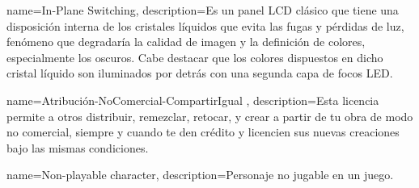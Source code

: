 

{
	name={In-Plane Switching},
	description={Es un panel LCD clásico que tiene una disposición interna de los cristales líquidos que evita las fugas y pérdidas de luz, fenómeno que degradaría la calidad de imagen y la definición de colores, especialmente los oscuros. Cabe destacar que los colores dispuestos en dicho cristal líquido son iluminados por detrás con una segunda capa de focos LED.}
}

{
	name={Atribución-NoComercial-CompartirIgual },
	description={Esta licencia permite a otros distribuir, remezclar, retocar, y crear a partir de tu obra de modo no comercial, siempre y cuando te den crédito y licencien sus nuevas creaciones bajo las mismas condiciones.}
}

{
	name={Non-playable character},
	description={Personaje no jugable en un juego.}
}

